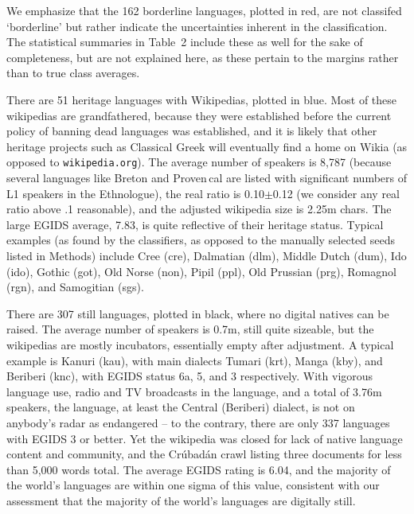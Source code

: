 \documentclass[10pt]{article}
\begin{document}
	

We emphasize that the 162 borderline languages, plotted in red, are not
classifed `borderline' but rather indicate the uncertainties inherent in the
classification. The statistical summaries in Table~2 include these as well for
the sake of completeness, but are not explained here, as these pertain to the
margins rather than to true class averages. 

There are 51 heritage languages with Wikipedias, plotted in blue.  Most of
these wikipedias are grandfathered, because they were established before the
current policy of banning dead languages was established, and it is likely
that other heritage projects such as Classical Greek will eventually find a
home on Wikia (as opposed to {\tt wikipedia.org}). The average number of
speakers is 8,787 (because several languages like Breton and Proven\,cal are
listed with significant numbers of L1 speakers in the Ethnologue), the real
ratio is 0.10$\pm$0.12 (we consider any real ratio above .1 reasonable), and
the adjusted wikipedia size is 2.25m chars. The large EGIDS average, 7.83, is
quite reflective of their heritage status. Typical examples (as found by the
classifiers, as opposed to the manually selected seeds listed in Methods)
include Cree (cre), Dalmatian (dlm), Middle Dutch (dum), Ido (ido), Gothic
(got), Old Norse (non), Pipil (ppl), Old Prussian (prg), Romagnol (rgn), and
Samogitian (sgs).

There are 307 still languages, plotted in black, where no digital
natives can be raised. The average number of speakers is 0.7m, still quite
sizeable, but the wikipedias are mostly incubators, essentially empty after
adjustment. A typical example is Kanuri (kau), with main dialects Tumari
(krt), Manga (kby), and Beriberi (knc), with EGIDS status 6a, 5, and 3
respectively. With vigorous language use, radio and TV broadcasts in the
language, and a total of 3.76m speakers, the language, at least the Central
(Beriberi) dialect, is not on anybody's radar as endangered -- to the
contrary, there are only 337 languages with EGIDS 3 or better. Yet the
wikipedia was closed for lack of native language content and community, and
the Cr\'ubad\'an crawl listing three documents for less than 5,000 words
total. The average EGIDS rating is 6.04, and the majority of the world's
languages are within one sigma of this value, consistent with our assessment
that the majority of the world's languages are digitally still.
\end{document}
